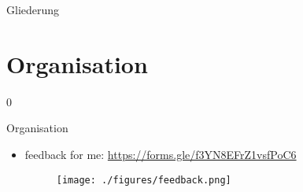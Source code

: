 \def\pascal{0}
\def\preview{1}









\begin{withoutheadline}
  \begin{withoutfootline}
    \begin{frame}
      \titlepagesecond
    \end{frame}
  \end{withoutfootline}

  \begin{frame}[shrink=10]{Gliederung}
    \tableofcontents[hideallsubsections]
  \end{frame}
\end{withoutheadline}

\setcounter{section}{-1}

\section{Organisation}

\if\pascal0{
  \begin{frame}{Organisation}
    \begin{itemize}
      \item \alert{feedback for me:} \url{https://forms.gle/f3YN8EFrZ1vsfPoC6}
      \begin{figure}
        \centering
        \texttt{[image: ./figures/feedback.png]}
      \end{figure}
    \end{itemize}
  \end{frame}
}\fi


